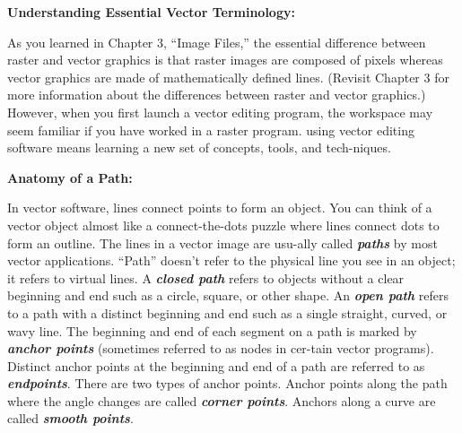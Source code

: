 \documentclass{report}
\begin{document}
    \bigbreak \noindent \bigbreak \noindent 
    \begin{Large}
      \textbf{Understanding  Essential  Vector Terminology:}
    \end{Large}
    \bigbreak \noindent 
    As you learned in Chapter 3, “Image Files,” the essential difference between raster and vector graphics is that raster images are composed of pixels whereas vector graphics are made of mathematically defined lines. (Revisit Chapter 3 for more information about the differences between raster and vector graphics.) However, when you first launch a vector editing program, the workspace may seem familiar if you have worked in a raster program.
    \bigbreak \noindent 
    using vector editing software means learning a new set of concepts, tools, and tech-niques.

    \bigbreak \noindent \bigbreak \noindent 
    \begin{large}
      \textbf{Anatomy of a Path:}
    \end{large}
    \bigbreak \noindent 
    In vector software, lines connect points to form an object. You can think of a vector object almost like a connect-the-dots puzzle where lines connect dots to form an outline. The lines in a vector image are usu-ally called \textbf{\textit{paths}} by most vector applications. “Path” doesn’t refer to the physical line you see in an object; it refers to virtual lines.
    \bigbreak \noindent 
    A \textbf{\textit{closed path}} refers to objects without a clear beginning and end such as a circle, square, or other shape.
    \bigbreak \noindent 
    An \textbf{\textit{open path}} refers to a path with a distinct beginning and end such as a single straight, curved, or wavy line.
    \bigbreak \noindent 
    The beginning and end of each segment on a path is marked by \textbf{\textit{anchor points}} (sometimes referred to as nodes in cer-tain vector programs). Distinct anchor points at the beginning and end of a path are referred to as \textbf{\textit{endpoints}}. There are two types of anchor points. Anchor points along the path where the angle changes are called \textbf{\textit{corner points}}. Anchors along a curve are called \textbf{\textit{smooth points}}.
\end{document}

